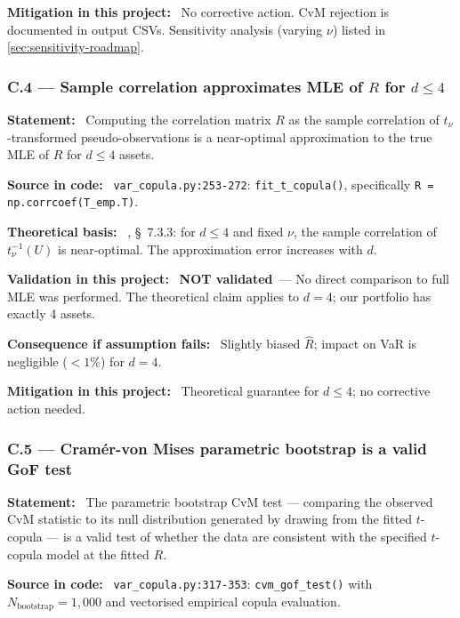 \documentclass[11pt,a4paper]{article}
\newcommand{\asmfield}[1]{\medskip\noindent\textbf{#1:}\ }
\newcommand{\code}[1]{\texttt{#1}}
\newcommand{\notvalidated}{\textbf{NOT validated}}
\begin{document}
\asmfield{Mitigation in this project}
No corrective action. CvM rejection is documented in output CSVs. Sensitivity
analysis (varying $\nu$) listed in \cref{sec:sensitivity-roadmap}.

\subsubsection{C.4 --- Sample correlation approximates MLE of $R$ for $d \le 4$}\label{asm:C4}

\asmfield{Statement}
Computing the correlation matrix $R$ as the sample correlation of
$t_\nu$-transformed pseudo-observations is a near-optimal approximation
to the true MLE of $R$ for $d \le 4$ assets.

\asmfield{Source in code}
\code{var\_copula.py:253-272}: \code{fit\_t\_copula()}, specifically
\lstinline|R = np.corrcoef(T_emp.T)|.

\asmfield{Theoretical basis}
\cite{McNeilFreyEmbrechts2005}, \S~7.3.3: for $d \le 4$ and fixed $\nu$,
the sample correlation of $t^{-1}_\nu(U)$ is near-optimal. The approximation
error increases with $d$.

\asmfield{Validation in this project}
\notvalidated\ --- No direct comparison to full MLE was performed. The
theoretical claim applies to $d = 4$; our portfolio has exactly 4 assets.

\asmfield{Consequence if assumption fails}
Slightly biased $\hat{R}$; impact on VaR is negligible ($< 1\%$) for $d = 4$.

\asmfield{Mitigation in this project}
Theoretical guarantee for $d \le 4$; no corrective action needed.

\subsubsection{C.5 --- Cram\'er-von Mises parametric bootstrap is a valid GoF test}\label{asm:C5}

\asmfield{Statement}
The parametric bootstrap CvM test --- comparing the observed CvM statistic
to its null distribution generated by drawing from the fitted $t$-copula ---
is a valid test of whether the data are consistent with the specified
$t$-copula model at the fitted $R$.

\asmfield{Source in code}
\code{var\_copula.py:317-353}: \code{cvm\_gof\_test()} with
$N_{\mathrm{bootstrap}} = 1{,}000$ and vectorised empirical copula evaluation.
\end{document}
